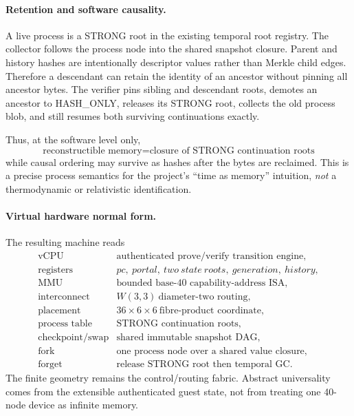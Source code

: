 \paragraph{Retention and software causality.}
A live process is a STRONG root in the existing temporal root registry. The
collector follows the process node into the shared snapshot closure. Parent and
history hashes are intentionally descriptor values rather than Merkle child
edges. Therefore a descendant can retain the identity of an ancestor without
pinning all ancestor bytes. The verifier pins sibling and descendant roots,
demotes an ancestor to HASH\_ONLY, releases its STRONG root, collects the old
process blob, and still resumes both surviving continuations exactly.

Thus, at the software level only,
\[
 \boxed{\text{reconstructible memory}
 =\text{closure of STRONG continuation roots}}
\]
while causal ordering may survive as hashes after the bytes are reclaimed.
This is a precise process semantics for the project's ``time as memory''
intuition, \emph{not} a thermodynamic or relativistic identification.

\paragraph{Virtual hardware normal form.}
The resulting machine reads
\[
\boxed{
\begin{array}{ll}
\text{vCPU} & \text{authenticated prove/verify transition engine},\\
\text{registers} & pc,\ portal,\ two\ state\ roots,\ generation,\ history,\\
\text{MMU} & \text{bounded base-40 capability-address ISA},\\
\text{interconnect} & W(3,3)\ \text{diameter-two routing},\\
\text{placement} & 36\times6\times6\ \text{fibre-product coordinate},\\
\text{process table} & \text{STRONG continuation roots},\\
\text{checkpoint/swap} & \text{shared immutable snapshot DAG},\\
\text{fork} & \text{one process node over a shared value closure},\\
\text{forget} & \text{release STRONG root then temporal GC}.
\end{array}}
\]
The finite geometry remains the control/routing fabric. Abstract universality
comes from the extensible authenticated guest state, not from treating one
40-node device as infinite memory.


